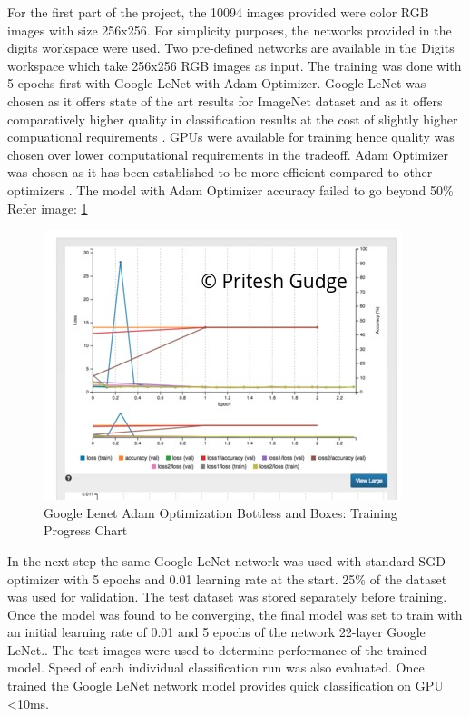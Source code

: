 \documentclass[10pt,journal,compsoc]{IEEEtran}
\begin{document}
For the first part of the project, the 10094 images provided were color RGB images with size 256x256. For simplicity purposes, the networks provided in the digits workspace were used. Two pre-defined networks are available in the Digits workspace which take 256x256 RGB images as input. The training was done with 5 epochs first with Google LeNet with Adam Optimizer. Google LeNet was chosen as it offers state of the art results for ImageNet dataset and as it offers comparatively higher quality in classification results\cite{DBLP} at the cost of slightly higher compuational requirements \label{googlelenet}. GPUs were available for training hence quality was chosen over lower computational requirements in the tradeoff.  Adam Optimizer was chosen as it has been established to be more efficient compared to other optimizers \cite{adam}. The model with Adam Optimizer accuracy failed to go beyond 50\% Refer image: \ref{fig:boxes_adam_opt}

\begin{figure}[thpb]
      \centering
      \includegraphics[width=\linewidth]{images/4_glenetadam_cropped_chart}
      \caption{Google Lenet Adam Optimization Bottless and Boxes: Training Progress Chart}
      \label{fig:boxes_adam_opt}
\end{figure}

In the next step the same Google LeNet network was used with standard SGD optimizer with 5 epochs and 0.01 learning rate at the start. 25\% of the dataset was used for validation. The test dataset was stored separately before training.
Once the model was found to be converging, the final model was set to train with an initial learning rate of 0.01 and 5 epochs of the network 22-layer Google LeNet.\cite{DBLP}. The test images were used to determine performance of the trained model. Speed of each individual classification run was also evaluated. Once trained the Google LeNet network model provides quick classification on GPU <10ms. 
\end{document}
